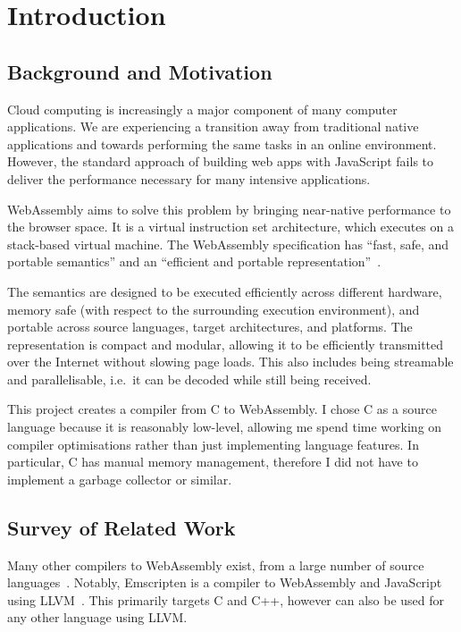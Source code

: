 \documentclass[00-main.tex]{subfiles}
\begin{document}
\chapter{Introduction}

\section{Background and Motivation}

Cloud computing is increasingly a major component of many computer applications.
We are experiencing a transition away from traditional native applications and towards performing the same tasks in an online environment.
However, the standard approach of building web apps with JavaScript fails to deliver the performance necessary for many intensive applications.

WebAssembly aims to solve this problem by bringing near-native performance to the browser space.
It is a virtual instruction set architecture, which executes on a stack-based virtual machine.
The WebAssembly specification has ``fast, safe, and portable semantics'' and an ``efficient and portable representation''~.

The semantics are designed to be executed efficiently across different hardware, memory safe (with respect to the surrounding execution environment), and portable across source languages, target architectures, and platforms.
The representation is compact and modular, allowing it to be efficiently transmitted over the Internet without slowing page loads.
This also includes being streamable and parallelisable, i.e.~it can be decoded while still being received.

This project creates a compiler from C to WebAssembly.
I chose C as a source language because it is reasonably low-level, allowing me spend time working on compiler optimisations rather than just implementing language features.
In particular, C has manual memory management, therefore I did not have to implement a garbage collector or similar.


\section{Survey of Related Work}

Many other compilers to WebAssembly exist, from a large number of source languages~.
Notably, Emscripten is a compiler to WebAssembly and JavaScript using LLVM~.
This primarily targets C and C++, however can also be used for any other language using LLVM\@.
\end{document}

